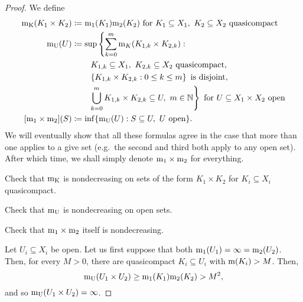 \begin{thm}
\begin{rmk}
\end{rmk}
\begin{proof}
We define
\begin{equation}
\begin{split}
\meas _{\mathrm{K}}(K_1\times K_2) & \coloneqq \meas _1(K_1)\meas _2(K_2)\text{ for }K_1\subseteq X_1,\ K_2\subseteq X_2\text{ quasicompact} \\
\meas _{\mathrm{U}}(U) & \coloneqq \sup \left\{ \sum _{k=0}^m\meas _K(K_{1,k}\times K_{2,k}):\right. \\
& \qquad \left. K_{1,k}\subseteq X_1,\ K_{2,k}\subseteq X_2\text{ quasicompact},\right. \\
& \qquad \left. \left\{ K_{1,k}\times K_{2,k}:0\leq k\leq m\right\} \text{ is disjoint},\right. \\
& \qquad \left. \bigcup _{k=0}^mK_{1,k}\times K_{2,k}\subseteq U,\ m\in \N \right\} \text{ for }U\subseteq X_1\times X_2\text{ open} \\
[\meas _1\times \meas _2](S) & \coloneqq \inf \{ \meas _{\mathrm{U}}(U):S\subseteq U,\ U\text{ open}\} .
\end{split}
\end{equation}
We will eventually show that all these formulas agree in the case that more than one applies to a give set (e.g.~the second and third both apply to any open set).  After which time, we shall simply denote $\mathrm{m} _1\times \mathrm{m} _2$ for everything.

\begin{exr}
Check that $\mathrm{m} _{\mathrm{K}}$ is nondecreasing on sets of the form $K_1\times K_2$ for $K_i\subseteq X_i$ quasicompact.
\end{exr}
\begin{exr}
Check that $\mathrm{m} _{\mathrm{U}}$ is nondecreasing on open sets.
\end{exr}
\begin{exr}
Check that $\mathrm{m} _1\times \mathrm{m} _2$ itself is nondecreasing.
\end{exr}

Let $U_i\subseteq X_i$ be open.  Let us first suppose that both $\mathrm{m} _1(U_1)=\infty =\mathrm{m} _2(U_2)$.  Then, for every $M>0$, there are quasicompact $K_i\subseteq U_i$ with $\mathrm{m} (K_i)>M$.  Then,
\begin{equation}
\mathrm{m} _{\mathrm{U}}(U_1\times U_2)\geq \mathrm{m} _1(K_1)\mathrm{m} _2(K_2)>M^2,
\end{equation}
and so $\mathrm{m} _{\mathrm{U}}(U_1\times U_2)=\infty$.


\end{proof}
\end{thm}
